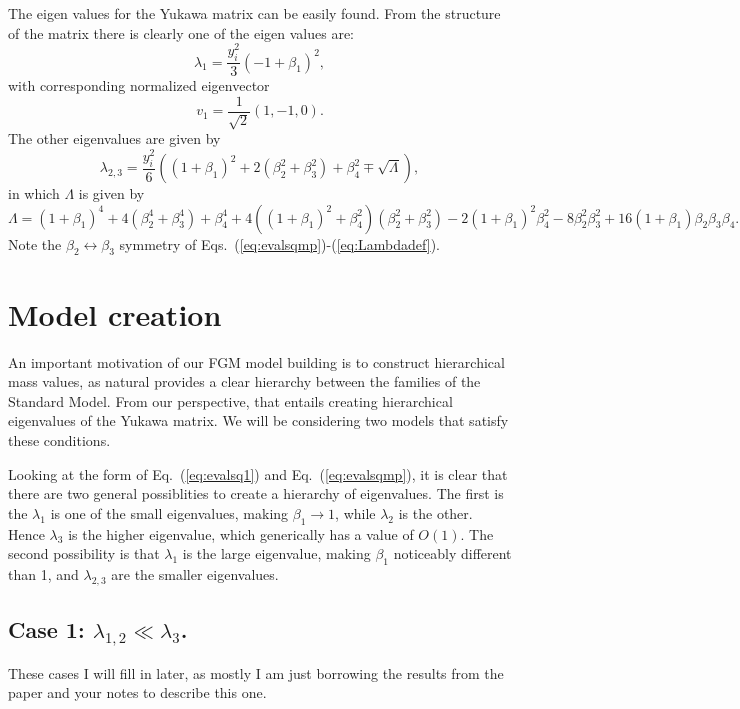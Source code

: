 The eigen values for the Yukawa matrix can be easily found. From the structure of the matrix there is clearly one of the eigen values are:
\begin{equation}
\lambda_1=\frac{y_{i}^2}{3}(-1+\beta_1)^2, 
\label{eq:evalsq1}
\end{equation}
with corresponding normalized eigenvector 
\begin{equation}
v_1=\frac{1}{\sqrt{2}}(1,-1,0).  
\end{equation}
The other eigenvalues are given by
\begin{equation}
\lambda_{2,3}= \frac{y_{i}^2}{6} \left ((1+\beta_1)^2+2(\beta_2^2+\beta_3^2)+ \beta_4^2 \mp \sqrt{\Lambda} \right ),
\label{eq:evalsqmp}
\end{equation}
in which $\Lambda$ is given by
\begin{equation}
\Lambda = (1+\beta_1)^4+4(\beta_2^4+\beta_3^4)+\beta_4^4+4((1+\beta_1)^2+\beta_4^2)(\beta_2^2+\beta_3^2)-2(1+\beta_1)^2\beta_4^2-8\beta_2^2\beta_3^2+16(1+\beta_1)\beta_2\beta_3 \beta_4.
\label{eq:Lambdadef}
\end{equation}
Note the $\beta_2\leftrightarrow \beta_3$ symmetry of Eqs.~(\ref{eq:evalsqmp})-(\ref{eq:Lambdadef}).

\section{Model creation}
An important motivation of our FGM model building is to construct hierarchical mass values, as natural provides a clear hierarchy between the families of the Standard Model. From our perspective, that entails creating hierarchical eigenvalues of the Yukawa matrix. We will be considering two models that satisfy these conditions.

Looking at the form of Eq.~(\ref{eq:evalsq1}) and Eq.~(\ref{eq:evalsqmp}), it is clear that there are two general possiblities to create a hierarchy of eigenvalues. The first is the $\lambda_1$ is one of the small eigenvalues, making $\beta_1\rightarrow 1$, while $\lambda_2$ is the other. Hence $\lambda_3$ is the higher eigenvalue, which generically has a value of $O(1)$. The second possibility is that $\lambda_1$ is the large eigenvalue, making $\beta_1$ noticeably different than 1, and $\lambda_{2,3}$ are the smaller eigenvalues. 

\subsection{Case 1: $\lambda_{1,2}\ll \lambda_3$.}
These cases I will fill in later, as mostly I am just borrowing the results from the paper and your notes to describe this one. 

